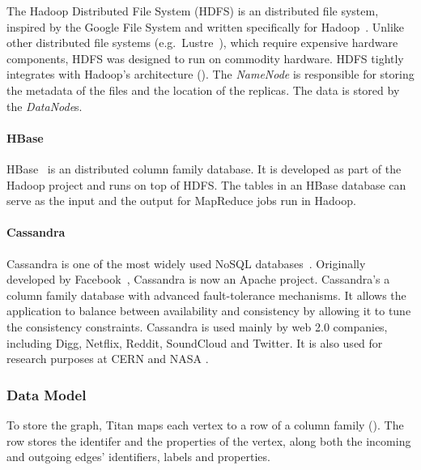 The Hadoop Distributed File System (HDFS) is an distributed file system, inspired by the Google File System and written specifically for Hadoop~\cite{Hadoop}. Unlike other distributed file systems (e.g.\ Lustre~\cite{Lustre}), which require expensive hardware components, HDFS was designed to run on commodity hardware. HDFS tightly integrates with Hadoop's architecture ().%
The \emph{NameNode} is responsible for storing the metadata of the files and the location of the replicas. The data is stored by the \emph{DataNode}s.


\paragraph{HBase} 

HBase~\cite{HBase} is an distributed column family database. It is developed as part of the Hadoop project and runs on top of HDFS. The tables in an HBase database can serve as the input and the output for MapReduce jobs run in Hadoop.

\paragraph{Cassandra}

Cassandra is one of the most widely used NoSQL databases~\cite{Cassandra}. Originally developed by Facebook~\cite{Lakshman:2010:CDS:1773912.1773922}, Cassandra is now an Apache project. 
Cassandra's a column family database with advanced fault-tolerance mechanisms. It allows the application to balance between availability and consistency by allowing it to tune the consistency constraints. Cassandra is used mainly by web 2.0 companies, including Digg, Netflix, Reddit, SoundCloud and Twitter. It is also used for research purposes at CERN and NASA \cite{CassandraCompanies}.

\subsubsection{Data Model}

To store the graph, Titan maps each vertex to a row of a column family (). The row stores the identifer and the properties of the vertex, along both the incoming and outgoing edges' identifiers, labels and properties.



